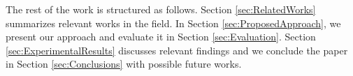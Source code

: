 The rest of the work is structured as follows. Section \ref{sec:RelatedWorks} summarizes relevant works in the field. In Section \ref{sec:ProposedApproach}, we present our approach and evaluate it in Section \ref{sec:Evaluation}. Section \ref{sec:ExperimentalResults} discusses relevant findings and we conclude the paper in Section \ref{sec:Conclusions} with possible future works.
